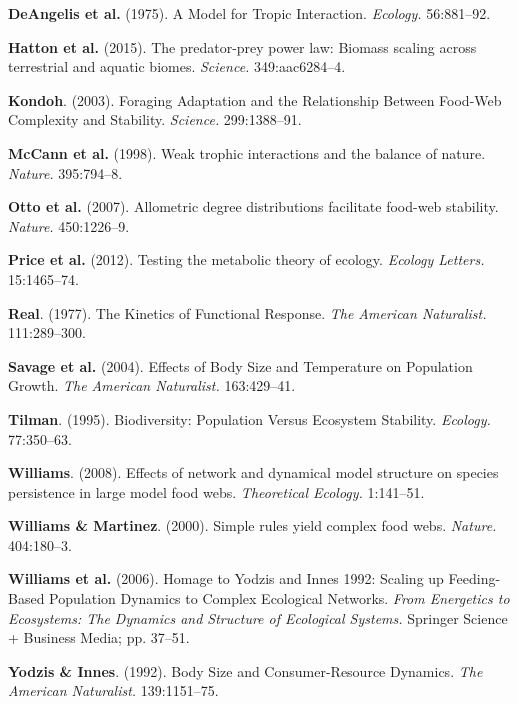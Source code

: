 \documentclass[12pt]{article}
\begin{document}
\hypertarget{ref-dean75mti}{}
\textbf{DeAngelis et al.} (1975). A Model for Tropic Interaction.
\emph{Ecology.} 56:881--92.

\hypertarget{ref-hatt15ppl}{}
\textbf{Hatton et al.} (2015). The predator-prey power law: Biomass
scaling across terrestrial and aquatic biomes. \emph{Science.}
349:aac6284--4.

\hypertarget{ref-kond03far}{}
\textbf{Kondoh}. (2003). Foraging Adaptation and the Relationship
Between Food-Web Complexity and Stability. \emph{Science.} 299:1388--91.

\hypertarget{ref-mcca98wti}{}
\textbf{McCann et al.} (1998). Weak trophic interactions and the balance
of nature. \emph{Nature.} 395:794--8.

\hypertarget{ref-otto07add}{}
\textbf{Otto et al.} (2007). Allometric degree distributions facilitate
food-web stability. \emph{Nature.} 450:1226--9.

\hypertarget{ref-pric12tmt}{}
\textbf{Price et al.} (2012). Testing the metabolic theory of ecology.
\emph{Ecology Letters.} 15:1465--74.

\hypertarget{ref-real77kfr}{}
\textbf{Real}. (1977). The Kinetics of Functional Response. \emph{The
American Naturalist.} 111:289--300.

\hypertarget{ref-sava04ebs}{}
\textbf{Savage et al.} (2004). Effects of Body Size and Temperature on
Population Growth. \emph{The American Naturalist.} 163:429--41.

\hypertarget{ref-tilm96bpv}{}
\textbf{Tilman}. (1995). Biodiversity: Population Versus Ecosystem
Stability. \emph{Ecology.} 77:350--63.

\hypertarget{ref-will08end}{}
\textbf{Williams}. (2008). Effects of network and dynamical model
structure on species persistence in large model food webs.
\emph{Theoretical Ecology.} 1:141--51.

\hypertarget{ref-will00sry}{}
\textbf{Williams \& Martinez}. (2000). Simple rules yield complex food
webs. \emph{Nature.} 404:180--3.

\hypertarget{ref-will07hyi}{}
\textbf{Williams et al.} (2006). Homage to Yodzis and Innes 1992:
Scaling up Feeding-Based Population Dynamics to Complex Ecological
Networks. \emph{From Energetics to Ecosystems: The Dynamics and
Structure of Ecological Systems.} Springer Science + Business Media; pp.
37--51.

\hypertarget{ref-yodz92bsc}{}
\textbf{Yodzis \& Innes}. (1992). Body Size and Consumer-Resource
Dynamics. \emph{The American Naturalist.} 139:1151--75.
\end{document}
